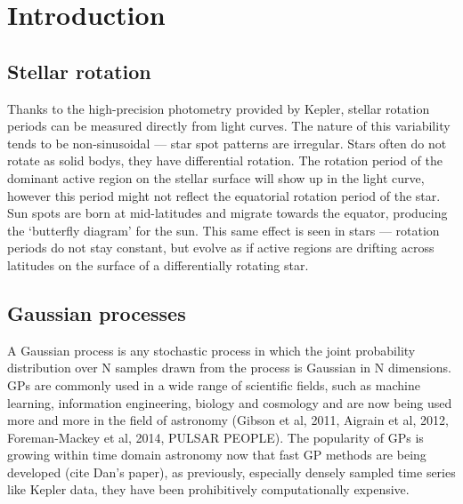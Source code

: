\documentclass[12pt,preprint]{aastex}
\begin{document}
\section{Introduction}

\subsection{Stellar rotation}

Thanks to the high-precision photometry provided by Kepler, stellar rotation periods can be measured directly from light curves.
The nature of this variability tends to be non-sinusoidal --- star spot patterns are irregular.
Stars often do not rotate as solid bodys, they have differential rotation.
The rotation period of the dominant active region on the stellar surface will show up in the light curve, however this period might not reflect the equatorial rotation period of the star.
Sun spots are born at mid-latitudes and migrate towards the equator, producing the `butterfly diagram' for the sun.
This same effect is seen in stars --- rotation periods do not stay constant, but evolve as if active regions are drifting across latitudes on the surface of a differentially rotating star.

\subsection{Gaussian processes}

A Gaussian process is any stochastic process in which the joint probability distribution over N samples drawn from the process is Gaussian in N dimensions.
GPs are commonly used in a wide range of scientific fields, such as machine learning, information engineering, biology and cosmology and are now being used more and more in the field of astronomy (Gibson et al, 2011, Aigrain et al, 2012, Foreman-Mackey et al, 2014, PULSAR PEOPLE).
The popularity of GPs is growing within time domain astronomy now that fast GP methods are being developed (cite Dan's paper), as previously, especially densely sampled time series like Kepler data, they have been prohibitively computationally expensive.
\end{document}
